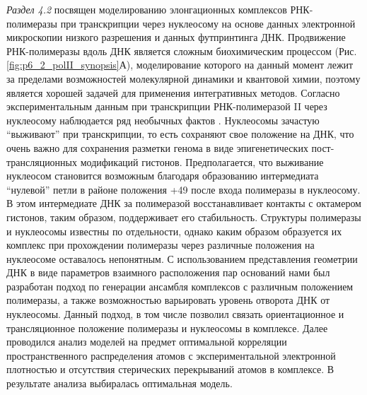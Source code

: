 \textit{Раздел 4.2} посвящен моделированию элонгационных комплексов РНК-полимеразы при транскрипции через нуклеосому на основе данных электронной микроскопии низкого разрешения и данных футпринтинга ДНК. Продвижение РНК-полимеразы вдоль ДНК является сложным биохимическим процессом (Рис. \ref{fig:p6_2_polII_synopsis}А), моделирование которого на данный момент лежит за пределами возможностей молекулярной динамики и квантовой химии, поэтому является хорошей задачей для применения интегративных методов.  Согласно экспериментальным данным при транскрипции РНК-полимеразой II через нуклеосому наблюдается ряд необычных фактов \cite{kulaeva_mechanism_2013}. Нуклеосомы зачастую ``выживают'' при транскрипции, то есть сохраняют свое положение на ДНК, что очень важно для сохранения разметки генома в виде эпигенетических пост-трансляционных модификаций гистонов. Предполагается, что выживание нуклеосом становится возможным благодаря образованию интермедиата ``нулевой'' петли в районе положения +49 после входа полимеразы в нуклеосому. В этом интермедиате ДНК за полимеразой восстанавливает контакты с октамером гистонов, таким образом, поддерживает его стабильность.
Структуры полимеразы и нуклеосомы известны по отдельности, однако каким образом образуется их комплекс при прохождении полимеразы через различные положения на нуклеосоме оставалось непонятным. С использованием представления геометрии ДНК в виде параметров взаимного расположения пар оснований нами был разработан подход по генерации ансамбля комплексов с различным положением полимеразы, а также возможностью варьировать уровень отворота ДНК от нуклеосомы. Данный подход, в том числе позволил связать ориентационное и трансляционное положение полимеразы и нуклеосомы в комплексе. Далее проводился анализ моделей на предмет оптимальной корреляции пространственного распределения атомов с экспериментальной электронной плотностью и отсутствия стерических перекрываний атомов в комплексе. В результате анализа выбиралась оптимальная модель.



